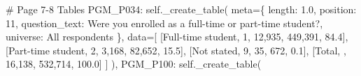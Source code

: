 \documentclass[
  11pt,
  a4paper,
]{article}
\newenvironment{Shaded}{\begin{snugshade}}{\end{snugshade}}
\newcommand{\CommentTok}[1]{\textcolor[rgb]{0.37,0.37,0.37}{#1}}
\newcommand{\NormalTok}[1]{\textcolor[rgb]{0.00,0.23,0.31}{#1}}
\newcommand{\OperatorTok}[1]{\textcolor[rgb]{0.37,0.37,0.37}{#1}}
\newcommand{\StringTok}[1]{\textcolor[rgb]{0.13,0.47,0.30}{#1}}
\newcommand{\VariableTok}[1]{\textcolor[rgb]{0.07,0.07,0.07}{#1}}
\begin{document}
\begin{Shaded}
\begin{Highlighting}[]
            \CommentTok{\# Page 7{-}8 Tables}
            \StringTok{\textquotesingle{}PGM\_P034\textquotesingle{}}\NormalTok{: }\VariableTok{self}\NormalTok{.\_create\_table(}
\NormalTok{                meta}\OperatorTok{=}\NormalTok{\{}
                    \StringTok{\textquotesingle{}length\textquotesingle{}}\NormalTok{: }\StringTok{\textquotesingle{}1.0\textquotesingle{}}\NormalTok{, }\StringTok{\textquotesingle{}position\textquotesingle{}}\NormalTok{: }\StringTok{\textquotesingle{}11\textquotesingle{}}\NormalTok{,}
                    \StringTok{\textquotesingle{}question\_text\textquotesingle{}}\NormalTok{: }\StringTok{\textquotesingle{}Were you enrolled as a full{-}time or part{-}time student?\textquotesingle{}}\NormalTok{,}
                    \StringTok{\textquotesingle{}universe\textquotesingle{}}\NormalTok{: }\StringTok{\textquotesingle{}All respondents\textquotesingle{}}
\NormalTok{                \},}
\NormalTok{                data}\OperatorTok{=}\NormalTok{[}
\NormalTok{                    [}\StringTok{\textquotesingle{}Full{-}time student\textquotesingle{}}\NormalTok{, }\StringTok{\textquotesingle{}1\textquotesingle{}}\NormalTok{, }\StringTok{\textquotesingle{}12,935\textquotesingle{}}\NormalTok{, }\StringTok{\textquotesingle{}449,391\textquotesingle{}}\NormalTok{, }\StringTok{\textquotesingle{}84.4\textquotesingle{}}\NormalTok{],}
\NormalTok{                    [}\StringTok{\textquotesingle{}Part{-}time student\textquotesingle{}}\NormalTok{, }\StringTok{\textquotesingle{}2\textquotesingle{}}\NormalTok{, }\StringTok{\textquotesingle{}3,168\textquotesingle{}}\NormalTok{, }\StringTok{\textquotesingle{}82,652\textquotesingle{}}\NormalTok{, }\StringTok{\textquotesingle{}15.5\textquotesingle{}}\NormalTok{],}
\NormalTok{                    [}\StringTok{\textquotesingle{}Not stated\textquotesingle{}}\NormalTok{, }\StringTok{\textquotesingle{}9\textquotesingle{}}\NormalTok{, }\StringTok{\textquotesingle{}35\textquotesingle{}}\NormalTok{, }\StringTok{\textquotesingle{}672\textquotesingle{}}\NormalTok{, }\StringTok{\textquotesingle{}0.1\textquotesingle{}}\NormalTok{],}
\NormalTok{                    [}\StringTok{\textquotesingle{}Total\textquotesingle{}}\NormalTok{, }\StringTok{\textquotesingle{}\textquotesingle{}}\NormalTok{, }\StringTok{\textquotesingle{}16,138\textquotesingle{}}\NormalTok{, }\StringTok{\textquotesingle{}532,714\textquotesingle{}}\NormalTok{, }\StringTok{\textquotesingle{}100.0\textquotesingle{}}\NormalTok{]}
\NormalTok{                ]}
\NormalTok{            ),}
            \StringTok{\textquotesingle{}PGM\_P100\textquotesingle{}}\NormalTok{: }\VariableTok{self}\NormalTok{.\_create\_table(}

\end{Highlighting}
\end{Shaded}
\end{document}
